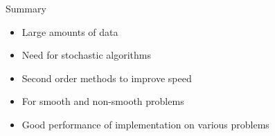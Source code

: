 \documentclass[10pt]{beamer}
\begin{document}
  \begin{frame}{Summary}
    \begin{itemize}
    	\item Large amounts of data
    	\item Need for stochastic algorithms
    	\item Second order methods to improve speed
    	\item For smooth and non-smooth problems
    	\item Good performance of implementation on various problems
    \end{itemize}
  \end{frame}


  \begin{frame}[allowframebreaks]

    \nocite{*}
    {\footnotesize{
    
    
    }
    }

  \end{frame}
\end{document}
